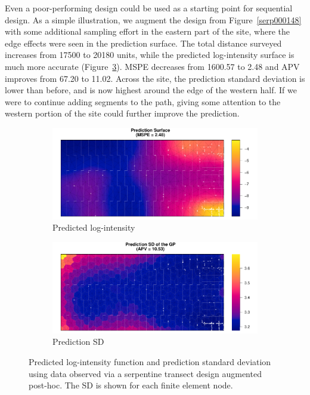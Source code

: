\documentclass[review]{elsarticle}
\begin{document}
Even a poor-performing design could be used as a starting point for sequential
design. As a simple illustration, we augment the design from
Figure~\ref{serp000148} with some additional sampling effort in the eastern
part of the site, where the edge effects were seen in the prediction surface.
The total distance surveyed increases from 17500 to 20180 units, while the
predicted log-intensity surface is much more accurate (Figure~\ref{aug}).
MSPE decreases from 1600.57 to 2.48 and APV improves from 67.20 to 11.02.
Across the site, the prediction standard deviation is lower than before, and
is now highest around the edge of the western half. If we were to continue
adding segments to the path, giving some attention to the western portion of
the site could further improve the prediction.


\begin{figure}

\begin{subfigure}{5in}
\includegraphics[width=5in]{../graphics/lambda-Aug-LGCP000004.pdf}
\caption{Predicted log-intensity}
\label{lambdaaug}
\end{subfigure}

\begin{subfigure}{5in}
\includegraphics[width=5in]{../graphics/lambdaSD-Aug-LGCP000004.pdf}
\caption{Prediction SD}
\label{sdaug}
\end{subfigure}

\caption{Predicted log-intensity function and prediction standard deviation
using data observed via a serpentine transect design augmented post-hoc. The
SD is shown for each finite element node.}
\label{aug}
\end{figure}
\end{document}

